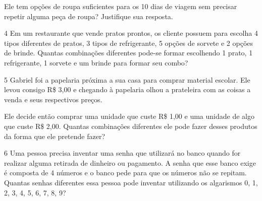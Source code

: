 Ele tem opções de roupa suficientes para os 10 dias de viagem sem
precisar repetir alguma peça de roupa? Justifique sua resposta.



\num{4} Em um restaurante que vende pratos prontos, os cliente possuem para
escolha 4 tipos diferentes de pratos, 3 tipos de refrigerante, 5 opções
de sorvete e 2 opções de brinde. Quantas combinações diferentes pode-se
formar escolhendo 1 prato, 1 refrigerante, 1 sorvete e um brinde para
formar seu combo?



\num{5} Gabriel foi a papelaria próxima a sua casa para comprar material
escolar. Ele levou consigo R\$ 3,00 e chegando à papelaria olhou a
prateleira com as coisas a venda e seus respectivos preços.


Ele decide então comprar uma unidade que custe R\$ 1,00 e uma unidade de
algo que custe R\$ 2,00. Quantas combinações diferentes ele pode fazer
desses produtos da forma que ele pretende fazer?



\num{6} Uma pessoa precisa inventar uma senha que utilizará no banco quando
for realizar alguma retirada de dinheiro ou pagamento. A senha que esse
banco exige é composta de 4 números e o banco pede para que os números
não se repitam. Quantas senhas diferentes essa pessoa pode inventar
utilizando os algarismos 0, 1, 2, 3, 4, 5, 6, 7, 8, 9?



